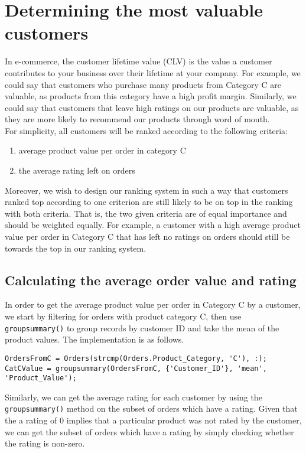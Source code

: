 \newpage
\section{Determining the most valuable customers}
In e-commerce, the customer lifetime value (CLV) is the value a customer contributes to your business over their lifetime at your company. For example, we could say that customers who purchase many products from Category C are valuable, as products from this category have a high profit margin. Similarly, we could say that customers that leave high ratings on our products are valuable, as they are more likely to recommend our products through word of mouth. \\

\noindent
For simplicity, all customers will be ranked according to the following criteria:
\begin{enumerate}[label=(\arabic*)]
  \item average product value per order in category C
  \item the average rating left on orders
\end{enumerate}

\noindent
Moreover, we wish to design our ranking system in such a way that customers ranked top according to one criterion are still likely to be on top in the ranking with both criteria. That is, the two given criteria are of equal importance and should be weighted equally. For example, a customer with a high average product value per order in Category C that has left no ratings on orders should still be towards the top in our ranking system.

\subsection{Calculating the average order value and rating}
In order to get the average product value per order in Category C by a customer, we start by filtering for orders with product category C, then use \lstinline|groupsummary()| to group records by customer ID and take the mean of the product values. The implementation is as follows.

\begin{lstlisting}
OrdersFromC = Orders(strcmp(Orders.Product_Category, 'C'), :);
CatCValue = groupsummary(OrdersFromC, {'Customer_ID'}, 'mean', 'Product_Value');
\end{lstlisting}

\noindent
Similarly, we can get the average rating for each customer by using the \lstinline|groupsummary()| method on the subset of orders which have a rating. Given that the a rating of 0 implies that a particular product was not rated by the customer, we can get the subset of orders which have a rating by simply checking whether the rating is non-zero.

